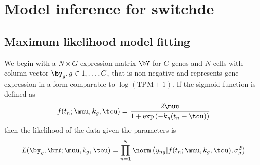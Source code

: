 \chapter{Model inference for switchde}





\section{Maximum likelihood model fitting} \label{app:switchdemle}

We begin with a $N \times G$ expression matrix $\bY$ for $G$ genes and $N$ cells with column vector $\by_g, g \in 1, \ldots, G$, that is non-negative and represents gene expression in a form comparable to $\log(\text{TPM} + 1)$. If the sigmoid function is defined as
\begin{equation}
	f(t_n; \muu, k_g, \tou) =
\frac{2 \muu}{1 + \exp\left( -k_g(t_n - \tou) \right)}
\end{equation}
then the likelihood of the data given the parameters is
\begin{equation}
	L(\by_g, \bm t; \muu, k_g, \tou) = \prod_{n = 1}^N \norm\left(y_{ng} | f(t_n; \muu, k_g, \tou), \sigma^2_g\right)
\end{equation}

